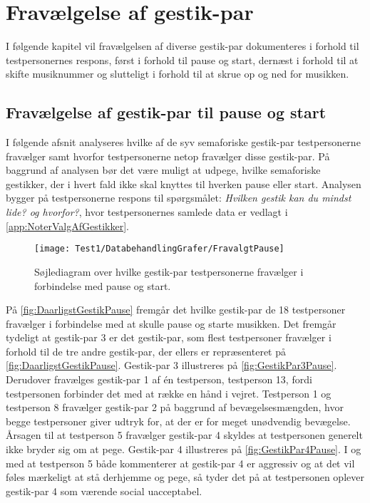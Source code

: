 \chapter{Fravælgelse af gestik-par}
\label{app:TestresultaterFravaelgelse}
%
I følgende kapitel vil fravælgelsen af diverse gestik-par dokumenteres i forhold til testpersonernes respons, først i forhold til pause og start, dernæst i forhold til at skifte musiknummer og slutteligt i forhold til at skrue op og ned for musikken. 
%
\section{Fravælgelse af gestik-par til pause og start}
\label{app:TestresultaterPauseDaarlig} 
%
I følgende afsnit analyseres hvilke af de syv semaforiske gestik-par testpersonerne fravælger samt hvorfor testpersonerne netop fravælger disse gestik-par. På baggrund af analysen bør det være muligt at udpege, hvilke semaforiske gestikker, der i hvert fald ikke skal knyttes til hverken pause eller start. Analysen bygger på testpersonerne respons til spørgsmålet: \textit{Hvilken gestik kan du mindst lide? og hvorfor?}, hvor testpersonernes samlede data er vedlagt i \autoref{app:NoterValgAfGestikker}.
%
\begin{figure}[H]
	\centering
	\texttt{[image: Test1/DatabehandlingGrafer/FravalgtPause]}
	\caption{Søjlediagram over hvilke gestik-par testpersonerne fravælger i forbindelse med pause og start.}
	\label{fig:DaarligstGestikPause}
\end{figure}
\noindent
% 
På \autoref{fig:DaarligstGestikPause} fremgår det hvilke gestik-par de 18 testpersoner fravælger i forbindelse med at skulle pause og starte musikken. Det fremgår tydeligt at gestik-par 3 er det gestik-par, som flest testpersoner fravælger i forhold til de tre andre gestik-par, der ellers er repræsenteret på \autoref{fig:DaarligstGestikPause}. Gestik-par 3 illustreres på \autoref{fig:GestikPar3Pause}. Derudover fravælges gestik-par 1 af én testperson, testperson 13, fordi testpersonen forbinder det med at række en hånd i vejret. Testperson 1 og testperson 8 fravælger gestik-par 2 på baggrund af bevægelsesmængden, hvor begge testpersoner giver udtryk for, at der er for meget unødvendig bevægelse. Årsagen til at testperson 5 fravælger gestik-par 4 skyldes at testpersonen generelt ikke bryder sig om at pege. Gestik-par 4 illustreres på \autoref{fig:GestikPar4Pause}. I og med at testperson 5 både kommenterer at gestik-par 4 er aggressiv og at det vil føles mærkeligt at stå derhjemme og pege, så tyder det på at testpersonen oplever gestik-par 4 som værende social uacceptabel. 
